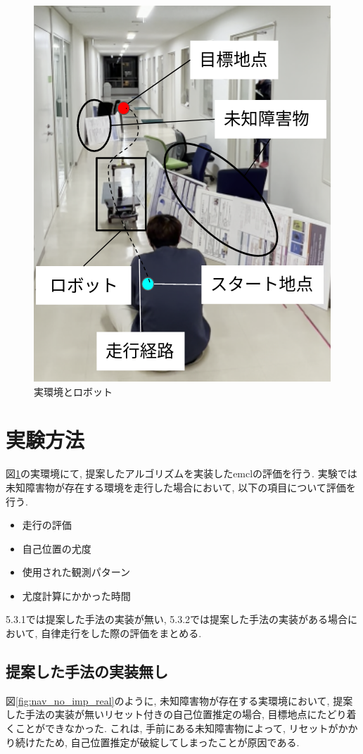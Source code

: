 \begin{figure}[H]
  \begin{center}
    \includegraphics[width=0.5\linewidth]{figs/real_environment.png}
    \caption{実環境とロボット}
    \label{fig:real_environment}
  \end{center}
\end{figure}

\section{実験方法}

図\ref{fig:real_environment}の実環境にて, 提案したアルゴリズムを実装したemclの評価を行う. 
実験では未知障害物が存在する環境を走行した場合において, 以下の項目について評価を行う. 
\begin{itemize}
  \item 走行の評価
  \item 自己位置の尤度
  \item 使用された観測パターン
  \item 尤度計算にかかった時間
\end{itemize}
5.3.1では提案した手法の実装が無い, 5.3.2では提案した手法の実装がある場合において, 
自律走行をした際の評価をまとめる. 

\newpage

\subsection{提案した手法の実装無し}

図\ref{fig:nav_no_imp_real}のように, 未知障害物が存在する実環境において, 
提案した手法の実装が無いリセット付きの自己位置推定の場合, 
目標地点にたどり着くことができなかった. これは, 手前にある未知障害物によって, リセットがかかり続けたため, 
自己位置推定が破綻してしまったことが原因である. 

